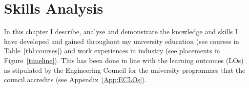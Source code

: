 \chapter{Skills Analysis} %

\label{Chapter3} %


In this chapter I describe, analyse and demonstrate the knowledge and skills I have developed and gained throughout my university education
(see courses in Table~\ref{tbl:courses})
and work experiences in industry
(see placements in Figure~\ref{timeline}).
This has been done in line with the learning outcomes (LOs) as stipulated by the Engineering Council for the university programmes that the council accredits (see Appendix~\ref{App:ECLOs}).


